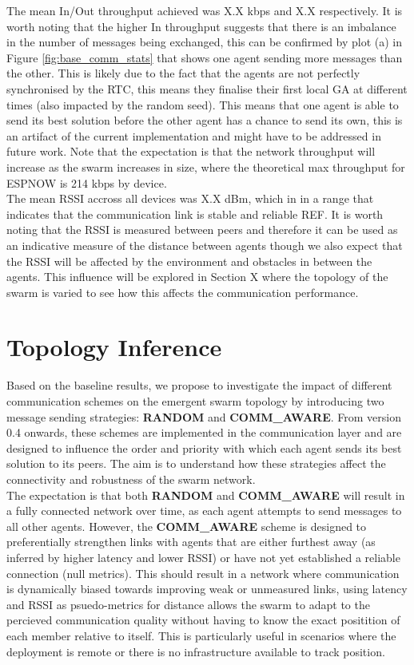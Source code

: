 \documentclass[conference]{IEEEtran}
\begin{document}
The mean In/Out throughput achieved was X.X kbps and X.X respectively. It is worth noting that the higher In throughput suggests that there is an imbalance in the number of messages being exchanged, this can be confirmed by plot (a) in Figure \ref{fig:base_comm_stats} that shows one agent sending more messages than the other. This is likely due to the fact that the agents are not perfectly synchronised by the RTC, this means they finalise their first local GA at different times (also impacted by the random seed). This means that one agent is able to send its best solution before the other agent has a chance to send its own, this is an artifact of the current implementation and might have to be addressed in future work. Note that the expectation is that the network throughput will increase as the swarm increases in size, where the theoretical max throughput for ESPNOW is 214 kbps by device.\\ 

The mean RSSI accross all devices was X.X dBm, which in in a range that indicates that the communication link is stable and reliable REF. It is worth noting that the RSSI is measured between peers and therefore it can be used as an indicative measure of the distance between agents though we also expect that the RSSI will be affected by the environment and obstacles in between the agents. This influence will be explored in Section X where the topology of the swarm is varied to see how this affects the communication performance.\\

\section{Topology Inference}

Based on the baseline results, we propose to investigate the impact of different communication schemes on the emergent swarm topology by introducing two message sending strategies: \textbf{RANDOM} and \textbf{COMM\_AWARE}. From version 0.4 onwards, these schemes are implemented in the communication layer and are designed to influence the order and priority with which each agent sends its best solution to its peers. The aim is to understand how these strategies affect the connectivity and robustness of the swarm network.\\

The expectation is that both \textbf{RANDOM} and \textbf{COMM\_AWARE} will result in a fully connected network over time, as each agent attempts to send messages to all other agents. However, the \textbf{COMM\_AWARE} scheme is designed to preferentially strengthen links with agents that are either furthest away (as inferred by higher latency and lower RSSI) or have not yet established a reliable connection (null metrics). This should result in a network where communication is dynamically biased towards improving weak or unmeasured links, using latency and RSSI as psuedo-metrics for distance allows the swarm to adapt to the percieved communication quality without having to know the exact positition of each member relative to itself. This is particularly useful in scenarios where the deployment is remote or there is no infrastructure available to track position.\\
\end{document}
